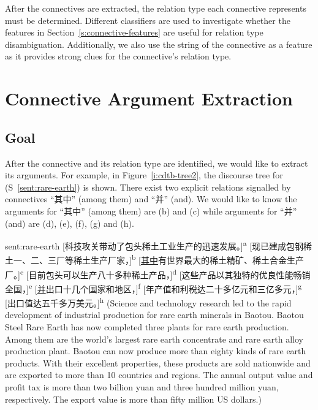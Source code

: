 After the connectives are extracted, the relation type each connective represents
must be determined. Different classifiers are used to investigate whether the features in
Section~\ref{s:connective-features} are useful for relation type disambiguation.
Additionally, we also use the string of the connective as a feature as it provides strong
clues for the connective's relation type.

\section{Connective Argument Extraction}

\subsection{Goal}

After the connective and its relation type are identified, we would like to extract
its arguments. For example, in Figure~\ref{i:cdtb-tree2}, the discourse tree
for (S~\ref{sent:rare-earth}) is shown. There exist two explicit relations signalled by
connectives ``其中'' (among them) and ``并'' (and). We would like to know the
arguments for ``其中'' (among them) are (b) and (c) while arguments for ``并'' (and) are
(d), (e), (f), (g) and (h).



\begin{sent}{sent:rare-earth}{}
    [科技攻关带动了包头稀土工业生产的迅速发展。]\textsuperscript{a}
    [现已建成包钢稀土一、二、三厂等稀土生产厂家，]\textsuperscript{b}
    [\underline{其中}有世界最大的稀土精矿、稀土合金生产厂。]\textsuperscript{c}
    [目前包头可以生产八十多种稀土产品，]\textsuperscript{d}
    [这些产品以其独特的优良性能畅销全国，]\textsuperscript{e}
    [\underline{并}出口十几个国家和地区，]\textsuperscript{f}
    [年产值和利税达二十多亿元和三亿多元，]\textsuperscript{g}
    [出口值达五千多万美元。]\textsuperscript{h}
    (Science and technology research led to the rapid development of industrial production
    for rare earth minerals in Baotou. Baotou Steel Rare Earth has now completed three
    plants for rare earth production. Among them are the world's largest rare earth
    concentrate and rare earth alloy production plant. Baotou can now produce more than
    eighty kinds of rare earth products. With their excellent properties, these products
    are sold nationwide and are exported to more than 10 countries and regions.
    The annual output value and profit tax is more
    than two billion yuan and three hundred million yuan, respectively.
    The export value is more than fifty million US dollars.)
\end{sent}

